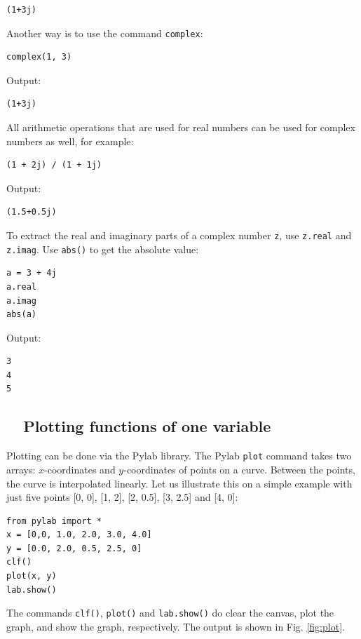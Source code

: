 \begin{verbatim}
(1+3j)
\end{verbatim}
Another way is to use the command {\tt complex}:

\begin{verbatim}
complex(1, 3)
\end{verbatim}
Output:

\begin{verbatim}
(1+3j)
\end{verbatim}
All arithmetic operations that are used for real numbers can be 
used for complex numbers as well, for example:

\begin{verbatim}
(1 + 2j) / (1 + 1j)
\end{verbatim}
Output:

\begin{verbatim}
(1.5+0.5j)
\end{verbatim}
To extract the real and imaginary parts of a complex number {\tt z}, use {\tt z.real}
and {\tt z.imag}. Use {\tt abs()} to get the absolute value:

\begin{verbatim}
a = 3 + 4j
a.real
a.imag
abs(a)
\end{verbatim}
Output:

\begin{verbatim}
3
4
5
\end{verbatim}


\subsection{\ \ Plotting functions of one variable}\label{plotting}

Plotting can be done via the Pylab library. The Pylab {\tt plot} command takes two
arrays: $x$-coordinates and $y$-coordinates of points on a curve. Between the 
points, the curve is interpolated linearly. Let us illustrate this on a simple 
example with just five points [0, 0], [1, 2], [2, 0.5], [3, 2.5] and [4, 0]:

\begin{verbatim}
from pylab import *
x = [0,0, 1.0, 2.0, 3.0, 4.0]
y = [0.0, 2.0, 0.5, 2.5, 0]
clf()
plot(x, y)
lab.show()
\end{verbatim}
The commands {\tt clf()}, {\tt plot()} and {\tt lab.show()} do clear the canvas, 
plot the graph, and show the graph, respectively.
The output is shown in Fig. \ref{fig:plot}.


